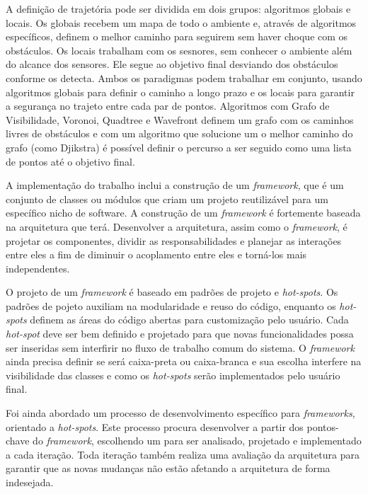 A definição de trajetória pode ser dividida em dois grupos: algoritmos globais e locais. Os globais recebem um mapa de todo o ambiente e, através de algoritmos específicos, definem o melhor caminho para seguirem sem haver choque com os obstáculos. Os locais trabalham com os sesnores, sem conhecer o ambiente além do alcance dos sensores. Ele segue ao objetivo final desviando dos obstáculos conforme os detecta. Ambos os paradigmas podem trabalhar em conjunto, usando algoritmos globais para definir o caminho a longo prazo e os locais para garantir a segurança no trajeto entre cada par de pontos. Algoritmos com Grafo de Visibilidade, Voronoi, Quadtree e Wavefront definem um grafo com os caminhos livres de obstáculos e com um algoritmo que solucione um o melhor caminho do grafo (como Djikstra) é possível definir o percurso a ser seguido como uma lista de pontos até o objetivo final.

A implementação do trabalho inclui a construção de um \textit{framework}, que é um conjunto de classes ou módulos que criam um projeto reutilizável para um específico nicho de software. A construção de um \textit{framework} é fortemente baseada na arquitetura que terá. Desenvolver a arquitetura, assim como o \textit{framework}, é projetar os componentes, dividir as responsabilidades e planejar as interações entre eles a fim de diminuir o acoplamento entre eles e torná-los mais independentes.

O projeto de um \textit{framework} é baseado em padrões de projeto e \textit{hot-spots}. Os padrões de pojeto auxiliam na modularidade e reuso do código, enquanto os \textit{hot-spots} definem as áreas do código abertas para customização pelo usuário. Cada \textit{hot-spot} deve ser bem definido e projetado para que novas funcionalidades possa ser inseridas sem interfirir no fluxo de trabalho comum do sistema. O \textit{framework} ainda precisa definir se será caixa-preta ou caixa-branca e sua escolha interfere na visibilidade das classes e como os \textit{hot-spots} serão implementados pelo usuário final.

Foi ainda abordado um processo de desenvolvimento específico para \textit{frameworks}, orientado a \textit{hot-spots}. Este processo procura desenvolver a partir dos pontos-chave do \textit{framework}, escolhendo um para ser analisado, projetado e implementado a cada iteração. Toda iteração também realiza uma avaliação da arquitetura para garantir que as novas mudanças não estão afetando a arquitetura de forma indesejada.